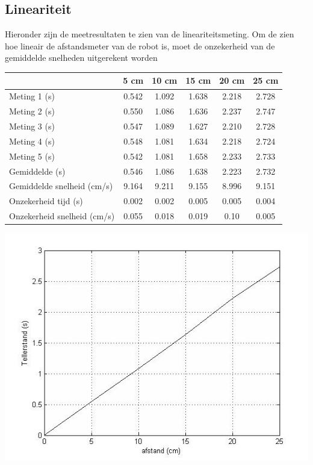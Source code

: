 \documentclass[12pt]{book}
\begin{document}
\subsection*{Lineariteit}
Hieronder zijn de meetresultaten te zien van de lineariteitsmeting. Om de zien hoe lineair de afstandsmeter van de robot is, moet de  onzekerheid van de gemiddelde snelheden uitgerekent worden
\begin{center}
\begin{tabular}{| l| c| c| c| c| c|}
\hline
   & 5 cm & 10 cm & 15 cm & 20 cm & 25 cm\\
\hline
   Meting 1 (s) & 0.542 & 1.092 & 1.638 & 2.218 & 2.728 \\
\hline
   Meting 2 (s) & 0.550 & 1.086 & 1.636 & 2.237 & 2.747 \\
\hline
   Meting 3 (s) & 0.547 & 1.089 & 1.627 & 2.210 & 2.728 \\
\hline
   Meting 4 (s) & 0.548 & 1.081 & 1.634 & 2.218 & 2.724 \\
\hline
   Meting 5 (s) & 0.542 & 1.081 & 1.658 & 2.233 & 2.733 \\
\hline
   Gemiddelde (s) & 0.546 & 1.086 & 1.638 & 2.223 & 2.732 \\
\hline
   Gemiddelde snelheid (cm/s) & 9.164 & 9.211 & 9.155 & 8.996 & 9.151 \\
\hline
   Onzekerheid tijd (s) & 0.002 & 0.002 & 0.005 & 0.005 & 0.004 \\
\hline
   Onzekerheid snelheid (cm/s) & 0.055 & 0.018 & 0.019 & 0.10 & 0.005 \\
\hline
 \end{tabular}
\end{center}
\begin{center}
\includegraphics[width=150mm] {afstand-tellerstand.jpg}
\end{center}
\end{document}
